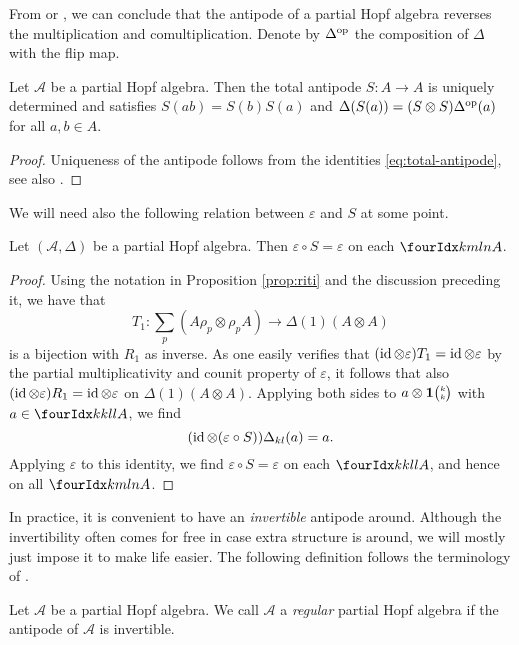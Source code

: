 From \cite[Proposition 3.5 and Proposition 3.7]{VDW1} or \cite[Theorem
6.12 and Corollary 6.16]{Boh1}, we can conclude that the antipode of a
partial Hopf algebra reverses the multiplication and
comultiplication. Denote by $\Delta^{\operatorname{\mathrm{op}}}$ the composition of
$\Delta$ with the flip map.

\begin{Cor} \label{corollary:antipode} Let $\mathscr{A}$ be a partial
  Hopf algebra. Then the total antipode $S:A\rightarrow A$ is uniquely determined and satisfies
  $S(ab) = S(b)S(a)$ and $\Delta(S(a)) = (S\otimes S)\Delta^{\operatorname{\mathrm{op}}}(a)$
  for all $a,b\in A$.
\end{Cor} 
\begin{proof} Uniqueness of the antipode follows from the identities \eqref{eq:total-antipode}, see also \cite[Remark 2.8.(ii)]{VDW1}. 
\end{proof} 

We will need also the following relation between $\varepsilon$ and $S$ at some point.

\begin{Lem}\label{LemCoAnt} Let $(\mathscr{A},\Delta)$ be a partial Hopf algebra. Then $\varepsilon\circ S = \varepsilon$ on each $\Gr{A}{k}{l}{m}{n}$.
\end{Lem}

\begin{proof} Using the notation in Proposition \ref{prop:riti} and the discussion preceding it, we have that \[T_1: \sum_p(A\rho_p\otimes \rho_p A)\rightarrow \Delta(1)(A\otimes A)\] is a bijection with $R_1$ as inverse. As one easily verifies that $(\operatorname{id}\otimes \varepsilon)T_1 = \operatorname{id}\otimes \varepsilon$ by the partial multiplicativity and counit property of $\varepsilon$, it follows that also $(\operatorname{id}\otimes \varepsilon)R_1 = \operatorname{id}\otimes \varepsilon$ on $\Delta(1)(A\otimes A)$. Applying both sides to $a\otimes \mathbf{1}{\tiny {\begin{pmatrix} k\\k\end{pmatrix}}}$ with $a\in \Gr{A}{k}{l}{k}{l}$, we find \[(\operatorname{id}\otimes (\varepsilon\circ S))\Delta_{kl}(a) = a.\] Applying $\varepsilon$ to this identity, we find $\varepsilon\circ S = \varepsilon$ on each $\Gr{A}{k}{l}{k}{l}$, and hence on all $\Gr{A}{k}{l}{m}{n}$.
\end{proof} 

In practice, it is convenient to have an \emph{invertible} antipode around. Although the invertibility often comes for free in case extra structure is around, we will mostly just impose it to make life easier. The following definition follows the terminology of \cite{VDae1}. 

\begin{Def} Let $\mathscr{A}$ be a partial Hopf algebra. We call $\mathscr{A}$ a \emph{regular} partial Hopf algebra if the antipode of $\mathscr{A}$ is invertible.
\end{Def}

